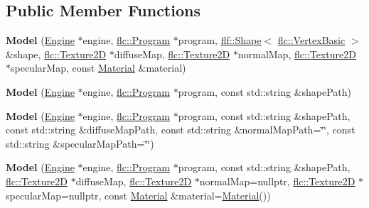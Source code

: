 \subsection*{Public Member Functions}
\begin{DoxyCompactItemize}
\item 
{\bfseries Model} (\hyperlink{classflw_1_1Engine}{Engine} $\ast$engine, \hyperlink{classflw_1_1flc_1_1Program}{flc\+::\+Program} $\ast$program, \hyperlink{classflw_1_1flf_1_1Shape}{flf\+::\+Shape}$<$ \hyperlink{structflw_1_1flc_1_1VertexBasic}{flc\+::\+Vertex\+Basic} $>$ \&shape, \hyperlink{classflw_1_1flc_1_1Texture2D}{flc\+::\+Texture2D} $\ast$diffuse\+Map, \hyperlink{classflw_1_1flc_1_1Texture2D}{flc\+::\+Texture2D} $\ast$normal\+Map, \hyperlink{classflw_1_1flc_1_1Texture2D}{flc\+::\+Texture2D} $\ast$specular\+Map, const \hyperlink{classflw_1_1flf_1_1Material}{Material} \&material)\hypertarget{classflw_1_1flf_1_1Model_aa83f3e9cc7f2d49ee34f9dcdd208654d}{}\label{classflw_1_1flf_1_1Model_aa83f3e9cc7f2d49ee34f9dcdd208654d}

\item 
{\bfseries Model} (\hyperlink{classflw_1_1Engine}{Engine} $\ast$engine, \hyperlink{classflw_1_1flc_1_1Program}{flc\+::\+Program} $\ast$program, const std\+::string \&shape\+Path)\hypertarget{classflw_1_1flf_1_1Model_ab57e72496bcae774f307b00a685299a9}{}\label{classflw_1_1flf_1_1Model_ab57e72496bcae774f307b00a685299a9}

\item 
{\bfseries Model} (\hyperlink{classflw_1_1Engine}{Engine} $\ast$engine, \hyperlink{classflw_1_1flc_1_1Program}{flc\+::\+Program} $\ast$program, const std\+::string \&shape\+Path, const std\+::string \&diffuse\+Map\+Path, const std\+::string \&normal\+Map\+Path=\char`\"{}\char`\"{}, const std\+::string \&specular\+Map\+Path=\char`\"{}\char`\"{})\hypertarget{classflw_1_1flf_1_1Model_abdb7f7c5d0f3f9ac4027578a52083c3f}{}\label{classflw_1_1flf_1_1Model_abdb7f7c5d0f3f9ac4027578a52083c3f}

\item 
{\bfseries Model} (\hyperlink{classflw_1_1Engine}{Engine} $\ast$engine, \hyperlink{classflw_1_1flc_1_1Program}{flc\+::\+Program} $\ast$program, const std\+::string \&shape\+Path, \hyperlink{classflw_1_1flc_1_1Texture2D}{flc\+::\+Texture2D} $\ast$diffuse\+Map, \hyperlink{classflw_1_1flc_1_1Texture2D}{flc\+::\+Texture2D} $\ast$normal\+Map=nullptr, \hyperlink{classflw_1_1flc_1_1Texture2D}{flc\+::\+Texture2D} $\ast$specular\+Map=nullptr, const \hyperlink{classflw_1_1flf_1_1Material}{Material} \&material=\hyperlink{classflw_1_1flf_1_1Material}{Material}())\hypertarget{classflw_1_1flf_1_1Model_a9cb521f1f149a4ad58933bad3430d9b5}{}\label{classflw_1_1flf_1_1Model_a9cb521f1f149a4ad58933bad3430d9b5}


\end{DoxyCompactItemize}
